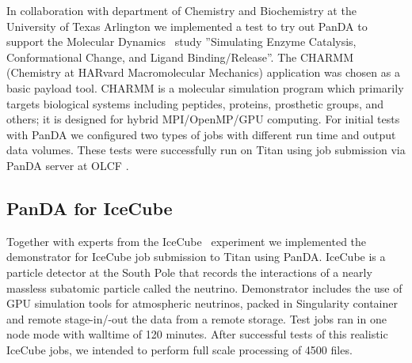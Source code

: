 \documentclass{webofc}
\begin{document}
In collaboration with department of Chemistry and Biochemistry at the University of Texas Arlington we implemented a test to try out PanDA to support the Molecular Dynamics~\cite{3b6dad414e794d36954333f8f177f47c} study ''Simulating Enzyme Catalysis, Conformational Change, and Ligand Binding/Release''. 
The CHARMM (Chemistry at HARvard Macromolecular Mechanics) application was chosen as a basic payload tool. 
CHARMM is a molecular simulation program which primarily targets biological systems including peptides, proteins, prosthetic groups, and others; it is designed for hybrid MPI/OpenMP/GPU computing.
For initial tests with PanDA we configured two types of jobs with different run time and output data volumes. 
These tests were successfully run on Titan using job submission via PanDA server at OLCF .


\subsection{PanDA for IceCube} \label{section_icecube}

Together with experts from the IceCube~\cite{doi:10.1063/1.3480478} experiment we implemented the demonstrator for IceCube job submission to Titan using PanDA. 
IceCube is a particle detector at the South Pole that records the interactions of a nearly massless subatomic particle called the neutrino. 
Demonstrator includes the use of GPU simulation tools for atmospheric neutrinos, packed in Singularity container and remote stage-in/-out the data from a remote storage. 
Test jobs ran in one node mode with walltime of 120 minutes. After successful tests of this realistic IceCube jobs, we intended to perform full scale processing of 4500 files.
\end{document}
